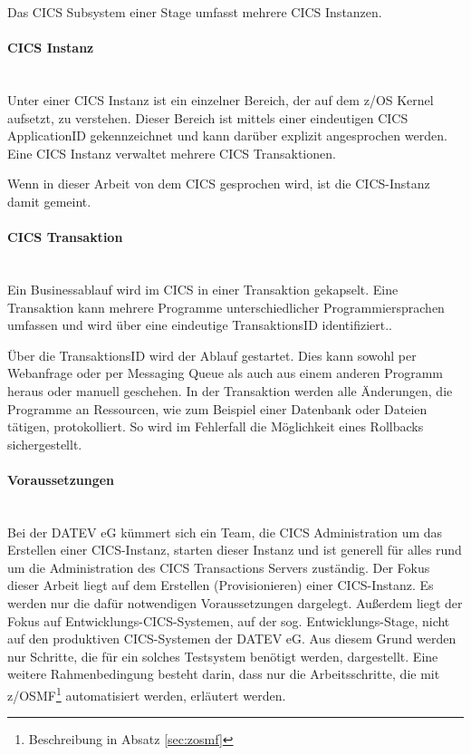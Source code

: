 Das CICS Subsystem einer Stage umfasst mehrere CICS Instanzen.

\paragraph{CICS Instanz} ~\\
Unter einer CICS Instanz ist ein einzelner Bereich, der auf dem z/OS Kernel aufsetzt, zu verstehen.
Dieser Bereich ist mittels einer eindeutigen CICS ApplicationID gekennzeichnet und kann darüber explizit angesprochen werden.
Eine CICS Instanz verwaltet mehrere CICS Transaktionen.

Wenn in dieser Arbeit von dem CICS gesprochen wird, ist die CICS-Instanz damit gemeint.

\paragraph{CICS Transaktion}\label{subsec:trans} ~\\
Ein Businessablauf wird im CICS in einer Transaktion gekapselt.
Eine Transaktion kann mehrere Programme unterschiedlicher Programmiersprachen umfassen und wird über eine eindeutige \glqq TransaktionsID\grqq{} identifiziert..

Über die TransaktionsID wird der Ablauf gestartet.
Dies kann sowohl per Webanfrage oder per Messaging Queue als auch aus einem anderen Programm heraus oder manuell geschehen.
In der Transaktion werden alle Änderungen, die Programme an Ressourcen, wie zum Beispiel einer Datenbank oder Dateien tätigen, protokolliert.
So wird im Fehlerfall die Möglichkeit eines Rollbacks sichergestellt.
 \cite{Rayns.2011}

\paragraph{Voraussetzungen}\label{subsec:voraus} ~\\
Bei der DATEV eG kümmert sich ein Team, die \glqq CICS Administration\grqq{} um das Erstellen einer CICS-Instanz, starten dieser Instanz und ist generell für alles rund um die Administration des CICS Transactions Servers zuständig.
Der Fokus dieser Arbeit liegt auf dem Erstellen (\glqq Provisionieren\grqq{}) einer CICS-Instanz. Es werden nur die dafür notwendigen Voraussetzungen dargelegt.
Außerdem liegt der Fokus auf Entwicklungs-CICS-Systemen, auf der sog. Entwicklungs-Stage, nicht auf den produktiven CICS-Systemen der DATEV eG. 
Aus diesem Grund werden nur Schritte, die für ein solches Testsystem benötigt werden, dargestellt.
Eine weitere Rahmenbedingung besteht darin, dass nur die Arbeitsschritte, die mit z/OSMF\footnote{Beschreibung in Absatz \ref{sec:zosmf}} automatisiert werden, erläutert werden.

